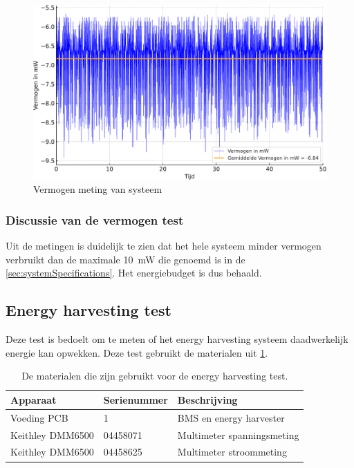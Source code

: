 \begin{figure}[!htbp]
    \centering
    \includegraphics[width=.85\textwidth]{img/vermogensMeting.pdf}
    \caption{Vermogen meting van systeem}
    \label{fig:vermogenMeting}
\end{figure}

\subsubsection{Discussie van de vermogen test}
Uit de metingen is duidelijk te zien dat het hele systeem minder vermogen verbruikt dan de maximale \qty{10}{\milli\watt} die genoemd is in de \cref{sec:systemSpecifications}. Het energiebudget is dus behaald.


\subsection{Energy harvesting test}\label{sec:harvestTest}
Deze test is bedoelt om te meten of het energy harvesting systeem daadwerkelijk energie kan opwekken. Deze test gebruikt de materialen uit \cref{tab:testMaterialen4}.

\begin{table}[!htbp]
    \centering
    \begin{tabular}{l|l|l}
        Apparaat         & Serienummer & Beschrijving \\
        \hline
        Voeding PCB      & 1           & BMS en energy harvester    \\
        Keithley DMM6500 & 04458071    & Multimeter spanningsmeting \\
        Keithley DMM6500 & 04458625    & Multimeter stroommeting    \\
        \hline
    \end{tabular}
    \caption{De materialen die zijn gebruikt voor de energy harvesting test.}
    \label{tab:testMaterialen4}
\end{table}

